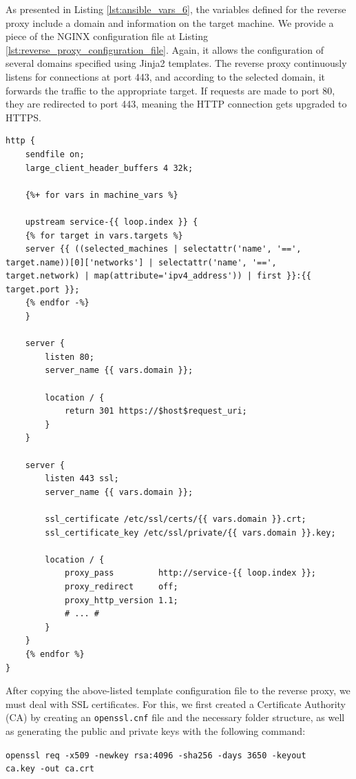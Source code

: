 As presented in Listing \ref{lst:ansible_vars_6}, the variables defined for the reverse proxy include a domain and information on the target machine. We provide a piece of the NGINX configuration file at Listing \ref{lst:reverse_proxy_configuration_file}. Again, it allows the configuration of several domains specified using Jinja2 templates. The reverse proxy continuously listens for connections at port 443, and according to the selected domain, it forwards the traffic to the appropriate target. If requests are made to port 80, they are redirected to port 443, meaning the HTTP connection gets upgraded to HTTPS.

\begin{lstlisting}[caption=Reverse Proxy Template Configuration.,numbers=none,label={lst:reverse_proxy_configuration_file}]
http {
    sendfile on;
    large_client_header_buffers 4 32k;

    {%+ for vars in machine_vars %}
    
    upstream service-{{ loop.index }} {
    {% for target in vars.targets %}
    server {{ ((selected_machines | selectattr('name', '==', target.name))[0]['networks'] | selectattr('name', '==', target.network) | map(attribute='ipv4_address')) | first }}:{{ target.port }};
    {% endfor -%}
    }

    server {
        listen 80;
        server_name {{ vars.domain }};

        location / {
            return 301 https://$host$request_uri;
        }
    }

    server {
        listen 443 ssl;
        server_name {{ vars.domain }};

        ssl_certificate /etc/ssl/certs/{{ vars.domain }}.crt;
        ssl_certificate_key /etc/ssl/private/{{ vars.domain }}.key;

        location / {
            proxy_pass         http://service-{{ loop.index }};
            proxy_redirect     off;
            proxy_http_version 1.1;
            # ... #
        }
    }
    {% endfor %}
}
\end{lstlisting}

After copying the above-listed template configuration file to the reverse proxy, we must deal with SSL certificates. For this, we first created a Certificate Authority (CA) by creating an \texttt{openssl.cnf} file and the necessary folder structure, as well as generating the public and private keys with the following command:

\texttt{openssl req -x509 -newkey rsa:4096 -sha256 -days 3650 -keyout \\
ca.key -out ca.crt}

